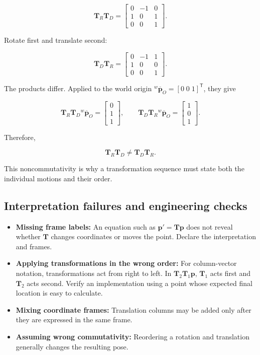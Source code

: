 \documentclass[
  australian,
  12pt,
  letterpaper,
  DIV=11,
  numbers=noendperiod,
  twoside]{scrreprt}
\providecommand{\tightlist}{%
  \setlength{\itemsep}{0pt}\setlength{\parskip}{0pt}}
\begin{document}
\[
\mathbf T_R\mathbf T_D
=
\begin{bmatrix}
0&-1&0\\
1&0&1\\
0&0&1
\end{bmatrix}.
\]

Rotate first and translate second:

\[
\mathbf T_D\mathbf T_R
=
\begin{bmatrix}
0&-1&1\\
1&0&0\\
0&0&1
\end{bmatrix}.
\]

The products differ. Applied to the world origin
\({}^{w}\overline{\mathbf p}_O=[0\;0\;1]^\mathsf T\), they give

\[
\mathbf T_R\mathbf T_D{}^{w}\overline{\mathbf p}_O
=
\begin{bmatrix}
0\\1\\1
\end{bmatrix},
\qquad
\mathbf T_D\mathbf T_R{}^{w}\overline{\mathbf p}_O
=
\begin{bmatrix}
1\\0\\1
\end{bmatrix}.
\]

Therefore,

\[
\boxed{
\mathbf T_R\mathbf T_D
\neq
\mathbf T_D\mathbf T_R
}.
\]

This noncommutativity is why a transformation sequence must state both
the individual motions and their order.

\subsection{Interpretation failures and engineering
checks}\label{interpretation-failures-and-engineering-checks}

\begin{itemize}
\tightlist
\item
  \textbf{Missing frame labels:} An equation such as
  \(\mathbf p'=\mathbf T\mathbf p\) does not reveal whether
  \(\mathbf T\) changes coordinates or moves the point. Declare the
  interpretation and frames.
\item
  \textbf{Applying transformations in the wrong order:} For
  column-vector notation, transformations act from right to left. In
  \(\mathbf T_2\mathbf T_1\mathbf p\), \(\mathbf T_1\) acts first and
  \(\mathbf T_2\) acts second. Verify an implementation using a point
  whose expected final location is easy to calculate.
\item
  \textbf{Mixing coordinate frames:} Translation columns may be added
  only after they are expressed in the same frame.
\item
  \textbf{Assuming wrong commutativity:} Reordering a rotation and
  translation generally changes the resulting pose.
\end{itemize}
\end{document}
